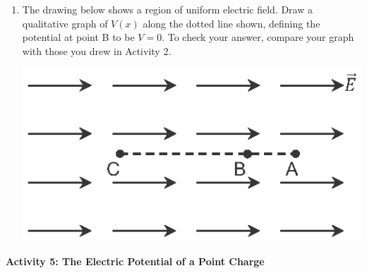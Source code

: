 \begin{enumerate}[labparts]
\item The drawing below shows a region of uniform electric field.  Draw a qualitative graph of $V(x)$ along the dotted line shown, defining the potential at point B to be $V=0$.  To check your answer, compare your graph with those you drew in Activity 2.  \label{part_potential_intro_draw_V} 

\begin{center}
\includegraphics{potential_intro/activity_5_figs/uniform_E_field_3.eps}
\hspace{0.5in}
\begin{lab_axis}[lab_noticks_2quads,
	algebraic_labels,
	width={2.3in}, height={2.2in},
	xlabel={$x$},
	ylabel={$V$},
	xtick={0.2, 0.6, 0.8},
	xticklabels = {C, B, A},
	]
\end{lab_axis}
\end{center}


\end{enumerate}

\textbf{Activity 5: The Electric Potential of a Point Charge}

